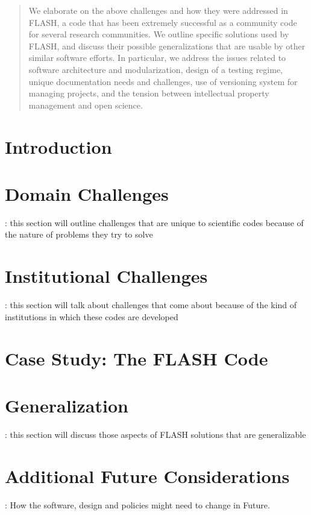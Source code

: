 \documentclass[11pt]{article}
\begin{document}
\begin{abstract}
We elaborate on the above challenges and
how they were addressed in FLASH, a code that has been extremely
successful as a community code for several research communities. We
outline specific solutions used by FLASH, and discuss their possible
generalizations that are usable by other similar software 
efforts. In particular, we address the issues related to software
architecture and modularization, design of a testing regime,
unique documentation needs and challenges, use of versioning system 
for managing projects, and the tension between intellectual property
management and open science. 
\end{abstract}


\section {Introduction} 

\section{Domain Challenges} : this section will outline challenges
  that are unique to scientific codes because of the nature of
  problems they try to solve
\section{Institutional Challenges}: this section will talk about
  challenges that come about because of the kind of institutions in
  which these codes are developed
\section{Case Study: The FLASH Code}
\section{Generalization} : this section will discuss those aspects of
  FLASH solutions that are generalizable
\section{Additional Future Considerations}: How the software,
  design and policies might need to change in Future.


\end{document}
